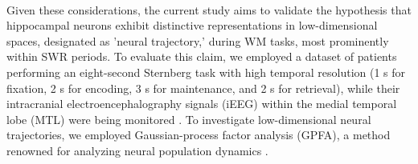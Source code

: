 \\
\indent
Given these considerations, the current study aims to validate the hypothesis that hippocampal neurons exhibit distinctive representations in low-dimensional spaces, designated as 'neural trajectory,' during WM tasks, most prominently within SWR periods. To evaluate this claim, we employed a dataset of patients performing an eight-second Sternberg task with high temporal resolution (1 s for fixation, 2 s for encoding, 3 s for maintenance, and 2 s for retrieval), while their intracranial electroencephalography signals (iEEG) within the medial temporal lobe (MTL) were being monitored \cite{boran_dataset_2020}. To investigate low-dimensional neural trajectories, we employed Gaussian-process factor analysis (GPFA), a method renowned for analyzing neural population dynamics \cite{yu_gaussian-process_2009}.
\label{sec:introduction}